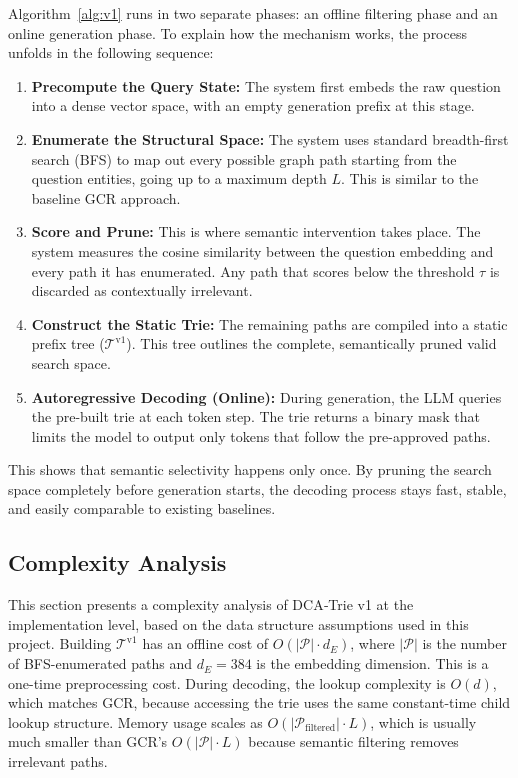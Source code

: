 Algorithm~\ref{alg:v1} runs in two separate phases: an offline filtering phase and an online generation phase. To explain how the mechanism works, the process unfolds in the following sequence:

\begin{enumerate}
  \item \textbf{Precompute the Query State:} The system first embeds the raw question into a dense vector space, with an empty generation prefix at this stage.
  \item \textbf{Enumerate the Structural Space:} The system uses standard breadth-first search (BFS) to map out every possible graph path starting from the question entities, going up to a maximum depth $L$. This is similar to the baseline GCR approach.
  \item \textbf{Score and Prune:} This is where semantic intervention takes place. The system measures the cosine similarity between the question embedding and every path it has enumerated. Any path that scores below the threshold $\tau$ is discarded as contextually irrelevant.
  \item \textbf{Construct the Static Trie:} The remaining paths are compiled into a static prefix tree ($\mathcal{T}^{\text{v1}}$). This tree outlines the complete, semantically pruned valid search space.
  \item \textbf{Autoregressive Decoding (Online):} During generation, the LLM queries the pre-built trie at each token step. The trie returns a binary mask that limits the model to output only tokens that follow the pre-approved paths.
\end{enumerate}

This shows that semantic selectivity happens only once. By pruning the search space completely before generation starts, the decoding process stays fast, stable, and easily comparable to existing baselines.

\subsection{Complexity Analysis}

This section presents a complexity analysis of DCA‑Trie v1 at the implementation level, based on the data structure assumptions used in this project. Building $\mathcal{T}^{\text{v1}}$ has an offline cost of $O(|\mathcal{P}| \cdot d_E)$, where $|\mathcal{P}|$ is the number of BFS-enumerated paths and $d_E = 384$ is the embedding dimension. This is a one-time preprocessing cost. During decoding, the lookup complexity is $O(d)$, which matches GCR, because accessing the trie uses the same constant-time child lookup structure. Memory usage scales as $O(|\mathcal{P}_{\text{filtered}}| \cdot L)$, which is usually much smaller than GCR's $O(|\mathcal{P}| \cdot L)$ because semantic filtering removes irrelevant paths.

